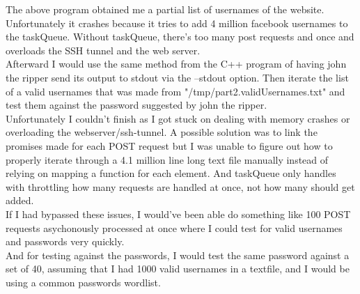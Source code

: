 \documentclass[12pt]{article}
\begin{document}
The above program obtained me a partial list of usernames of the website. Unfortunately it crashes because it tries to add 4 million facebook usernames to the taskQueue. Without taskQueue, there's too many post requests and once and overloads the SSH tunnel and the web server.\\

Afterward I would use the same method from the C++ program of having john the ripper send its output to stdout via the --stdout option. Then iterate the list of a valid usernames that was made from "/tmp/part2.validUsernames.txt" and test them against the password suggested by john the ripper.\\

Unfortunately I couldn't finish as I got stuck on dealing with memory crashes or overloading the webserver/ssh-tunnel. A possible solution was to link the promises made for each POST request but I was unable to figure out how to properly iterate through a 4.1 million line long text file manually instead of relying on mapping a function for each element. And taskQueue only handles with throttling how many requests are handled at once, not how many should get added.\\

If I had bypassed these issues, I would've been able do something like 100 POST requests asychonously processed at once where I could test for valid usernames and passwords very quickly.\\

And for testing against the passwords, I would test the same password against a set of 40, assuming that I had 1000 valid usernames in a textfile, and I would be using a common passwords wordlist.
\end{document}

